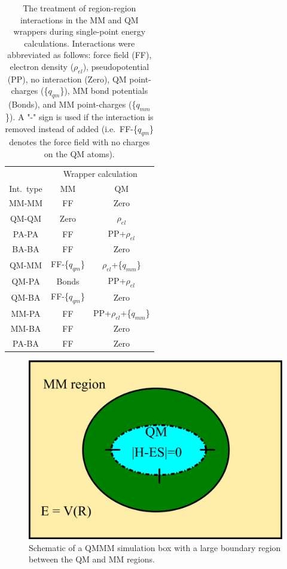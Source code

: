 \documentclass[12pt]{report}
\begin{document}
\begin{table}[hbt]
 \centering
 \begin{tabular}{|c|c c|}
 \hline
  & \multicolumn{2}{|c|}{Wrapper calculation} \\
 Int.\ type & MM & QM \\ \hline
 MM-MM & FF & Zero \\
 QM-QM & Zero & $\rho_{el}$ \\
 PA-PA & FF & PP+$\rho_{el}$ \\
 BA-BA & FF & Zero \\
 QM-MM & FF-\{$q_{qm}$\} & $\rho_{el}$+\{$q_{mm}$\} \\
 QM-PA & Bonds & PP+$\rho_{el}$ \\
 QM-BA & FF-\{$q_{qm}$\} & Zero \\
 MM-PA & FF & PP+$\rho_{el}$+\{$q_{mm}$\} \\
 MM-BA & FF & Zero \\
 PA-BA & FF & Zero \\ \hline
 \end{tabular}
 \caption{
 The treatment of region-region interactions in the MM and QM
 wrappers during single-point energy calculations.
 Interactions were abbreviated as follows: force field (FF), electron density
 ($\rho_{el}$), pseudopotential (PP), no interaction (Zero), QM point-charges
 (\{$q_{qm}$\}), MM bond potentials (Bonds), and MM point-charges
 (\{$q_{mm}$\}).
 A "-" sign is used if the interaction is removed instead of added
 (i.e.\ FF-\{$q_{qm}$\} denotes the force field with no charges on the
 QM atoms).}
 \label{tab:IntTable}
\end{table}

\begin{figure}[hbt]
 \centering
 \includegraphics[scale=0.50]{../doc/images/QMMM_3.png}
 \caption{
 Schematic of a QMMM simulation box with a large boundary region
 between the QM and MM regions.}
 \label{fig:QMMM3}
\end{figure}
\end{document}
